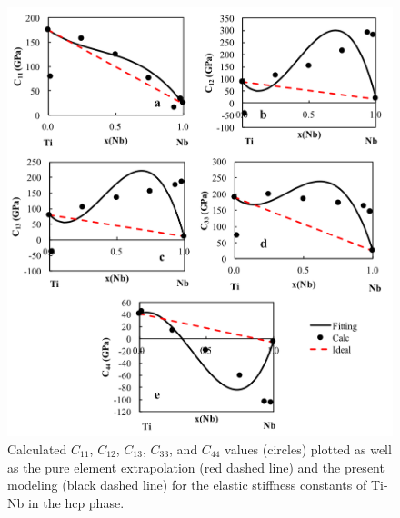 \pagebreak
\begin{figure}[H]
	\centering
	\includegraphics[width=\textwidth]{Chapter-7/Figures/hcpe1.png}
	\caption{Calculated $C_{11}$, $C_{12}$, $C_{13}$, $C_{33}$, and $C_{44}$ values (circles) plotted as well as the pure element extrapolation (red dashed line) and the present modeling (black dashed line) for the elastic stiffness constants of Ti-Nb in the hcp phase.}
	\label{Ch7-figure:hcpe1}
\end{figure}

